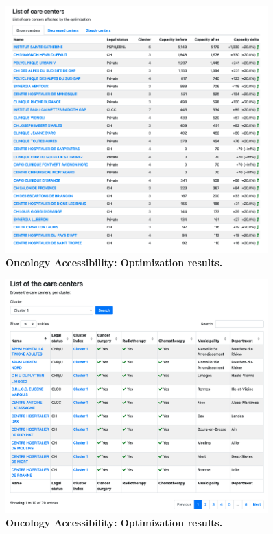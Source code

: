 \begin{figure}[H]
    \includegraphics[width=0.9\textwidth]{images/oncology-accessibility/optim-paca-grown-hospitals.png}
    \centering
    \caption{
        \textbf{Oncology Accessibility: Optimization results.}
    }
\end{figure}

\begin{figure}[H]
    \includegraphics[width=0.9\textwidth]{images/oncology-accessibility/centers-cluster-1.png}
    \centering
    \caption{
        \textbf{Oncology Accessibility: Optimization results.}
    }
\end{figure}

